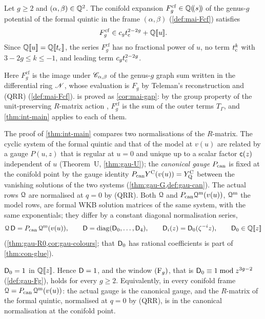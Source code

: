 \begin{cor}
\label{cor:int-gap}
Let $g\geq2$ and $(\alpha,\beta)\in\mathbb{Q}^2$. The conifold expansion $F_g^{\mathrm{cf}}\in\mathbb{Q}(\!(s)\!)$ of the genus-$g$ potential of the formal quintic in the frame $(\alpha,\beta)$ (\cref{def:mai-Fcf}) satisfies
\[
F_g^{\mathrm{cf}}\in c_gt_{\mathrm{c}}^{2-2g}+\mathbb{Q}[\![ u ]\!] .
\]
Since $\mathbb{Q}[\![ u ]\!]=\mathbb{Q}[\![ t_{\mathrm{c}} ]\!]$, the series $F_g^{\mathrm{cf}}$ has no fractional power of $u$, no term $t_{\mathrm{c}}^k$ with $3-2g\leq k\leq-1$, and leading term $c_gt_{\mathrm{c}}^{2-2g}$.
\end{cor}

Here $F_g^{\mathrm{cf}}$ is the image under $\mathscr{C}_{\alpha,\beta}$ of the genus-$g$ graph sum written in the differential ring $\mathscr{N}$, whose evaluation is $F_g$ by Teleman's reconstruction and (QRR) (\cref{def:mai-Fcf}).  is proved as \cref{cor:mai-gap}: by the group property of the unit-preserving $R$-matrix action \cite[Def.~2.13, Prop.~2.14]{PPZ15}, $F_g^{\mathrm{cf}}$ is the sum of the outer terms $T_\Gamma$, and \cref{thm:int-main} applies to each of them.

The proof of \cref{thm:int-main} compares two normalisations of the $R$-matrix. The cyclic system of the formal quintic and that of the model at $v(u)$ are related by a gauge $P(u,z)$ that is regular at $u=0$ and unique up to a scalar factor $\mathsf{c}(z)$ independent of $u$ (Theorem~U, \cref{thm:gau-U}); the \emph{canonical gauge} $P_{\mathrm{can}}$ is fixed at the conifold point by the gauge identity $P_{\mathrm{can}}Y^{\mathrm{C}}(v(u))=Y^{\mathrm{C}}_{\mathrm{Q}}$ between the vanishing solutions of the two systems (\cref{thm:gau-G,def:gau-can}). The actual rows $\mathcal{Q}$ are normalised at $q=0$ by (QRR). Both $\mathcal{Q}$ and $P_{\mathrm{can}}\mathcal{Q}^{\mathrm m}(v(u))$, $\mathcal{Q}^{\mathrm m}$ the model rows, are formal WKB solution matrices of the same system, with the same exponentials; they differ by a constant diagonal normalisation series,
\[
\mathcal{Q}\,\mathsf{D}=P_{\mathrm{can}}\,\mathcal{Q}^{\mathrm m}(v(u)),\qquad \mathsf{D}=\operatorname{diag}(\mathsf{D}_0,\dots,\mathsf{D}_4),\qquad \mathsf{D}_i(z)=\mathsf{D}_0(\zeta^{-i}z),\qquad \mathsf{D}_0\in\mathbb{Q}[\![ z ]\!]
\]
(\cref{thm:gau-R0,cor:gau-colours}; that $\mathsf{D}_0$ has rational coefficients is part of \cref{thm:con-glue}).

\begin{thm}
\label{thm:int-D}
$\mathsf{D}_0=1$ in $\mathbb{Q}[\![ z ]\!]$. Hence $\mathsf{D}=1$, and the window $(\mathrm{F}_{g})$, that is $\mathsf{D}_0\equiv1\bmod z^{3g-2}$ (\cref{def:gau-Fg}), holds for every $g\geq2$. Equivalently, in every conifold frame $\mathcal{Q}=P_{\mathrm{can}}\,\mathcal{Q}^{\mathrm m}(v(u))$: the actual gauge is the canonical gauge, and the $R$-matrix of the formal quintic, normalised at $q=0$ by (QRR), is in the canonical normalisation at the conifold point.
\end{thm}

